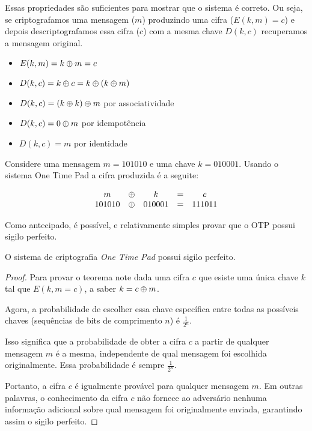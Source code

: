 Essas propriedades são suficientes para mostrar que o sistema é correto.
Ou seja, se criptografamos uma mensagem ($m$) produzindo uma cifra ($E(k,m) = c$) e depois descriptografamos essa cifra ($c$) com a mesma chave $D(k,c)$ recuperamos a mensagem original.

\begin{itemize}
\item[] $E(k,m) = k \oplus m = c$
\item[] $D(k,c) = k \oplus c = k \oplus (k \oplus m)$
\item[] $D(k,c) = (k \oplus k) \oplus m$ por associatividade
\item[] $D(k,c) = 0 \oplus m$ por idempotência
\item[] $D(k,c) = m$ por identidade
\end{itemize}

\begin{example}
  Considere uma mensagem $m = 101010$ e uma chave $k = 010001$.
Usando o sistema One Time Pad a cifra produzida é a seguite:

\begin{displaymath}
  \begin{array}{ccccc}
    m & \oplus & k & = & c \\
    101010 & \oplus & 010001 & = & 111011
  \end{array}
\end{displaymath}
\end{example}

Como antecipado, é possível, e relativamente simples provar que o OTP possui sigilo perfeito.

\begin{theorem}
  O sistema de criptografia {\em One Time Pad} possui sigilo perfeito.
\end{theorem}
\begin{proof}
Para provar o teorema note dada uma cifra $c$ que esiste uma única chave $k$ tal que $E(k,m = c)$, a saber $k = c \oplus m$.

Agora, a probabilidade de escolher essa chave específica entre todas as possíveis chaves (sequências de bits de comprimento $n$) é $\frac{1}{2^n}$.

Isso significa que a probabilidade de obter a cifra $c$ a partir de qualquer mensagem $m$ é a mesma, independente de qual mensagem foi escolhida originalmente.
Essa probabilidade é sempre $\frac{1}{2^n}$.

Portanto, a cifra $c$ é igualmente provável para qualquer mensagem $m$.
Em outras palavras, o conhecimento da cifra $c$ não fornece ao adversário nenhuma informação adicional sobre qual mensagem foi originalmente enviada, garantindo assim o sigilo perfeito.
\end{proof}

